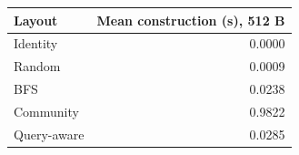 \begin{tabular}{lr}
\toprule
Layout & Mean construction (s), 512 B \\
\midrule
Identity & 0.0000 \\
Random & 0.0009 \\
BFS & 0.0238 \\
Community & 0.9822 \\
Query-aware & 0.0285 \\
\bottomrule
\end{tabular}
